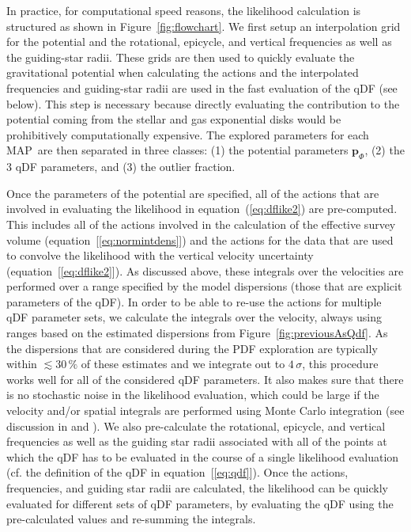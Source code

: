 \documentclass{emulateapj}
\newcommand{\eqnname}{equation}
\newcommand{\equationname}{\eqnname}
\renewcommand{\figurename}{Figure}
\renewcommand{\vec}[1]{\ensuremath{\mathbf{#1}}}
\newcommand{\paramspot}{\ensuremath{\vec{p}_\Phi}}
\newcommand{\map}{MAP}
\begin{document}
In practice, for computational speed reasons, the likelihood
calculation is structured as shown in
\figurename~\ref{fig:flowchart}. We first setup an interpolation grid
for the potential and the rotational, epicycle, and vertical
frequencies as well as the guiding-star radii. These grids are then
used to quickly evaluate the gravitational potential when calculating
the actions and the interpolated frequencies and guiding-star radii
are used in the fast evaluation of the qDF (see below). This step is
necessary because directly evaluating the contribution to the
potential coming from the stellar and gas exponential disks would be
prohibitively computationally expensive.  The explored parameters for
each \map\ are then separated in three classes: (1) the potential
parameters \paramspot, (2) the 3 qDF parameters, and (3) the outlier
fraction.

Once the parameters of the potential are specified, all of the actions
that are involved in evaluating the likelihood in
\equationname~(\ref{eq:dflike2}) are pre-computed. This includes all
of the actions involved in the calculation of the effective survey
volume (\equationname~[\ref{eq:normintdens}]) and the actions for the
data that are used to convolve the likelihood with the vertical
velocity uncertainty (\equationname~[\ref{eq:dflike2}]). As discussed
above, these integrals over the velocities are performed over a range
specified by the model dispersions (those that are explicit parameters
of the qDF). In order to be able to re-use the actions for multiple
qDF parameter sets, we calculate the integrals over the velocity,
always using ranges based on the estimated dispersions from
\figurename~\ref{fig:previousAsQdf}. As the dispersions that are
considered during the PDF exploration are typically within $\lesssim
30\,\%$ of these estimates and we integrate out to $4\,\sigma$, this
procedure works well for all of the considered qDF parameters. It also
makes sure that there is no stochastic noise in the likelihood
evaluation, which could be large if the velocity and/or spatial
integrals are performed using Monte Carlo integration (see discussion
in \citealt{McMillan13a} and \citealt{Ting13a}). We also pre-calculate
the rotational, epicycle, and vertical frequencies as well as the
guiding star radii associated with all of the points at which the qDF
has to be evaluated in the course of a single likelihood evaluation
(cf. the definition of the qDF in \equationname~[\ref{eq:qdf}]). Once
the actions, frequencies, and guiding star radii are calculated, the
likelihood can be quickly evaluated for different sets of qDF
parameters, by evaluating the qDF using the pre-calculated values and
re-summing the integrals.
\end{document}
